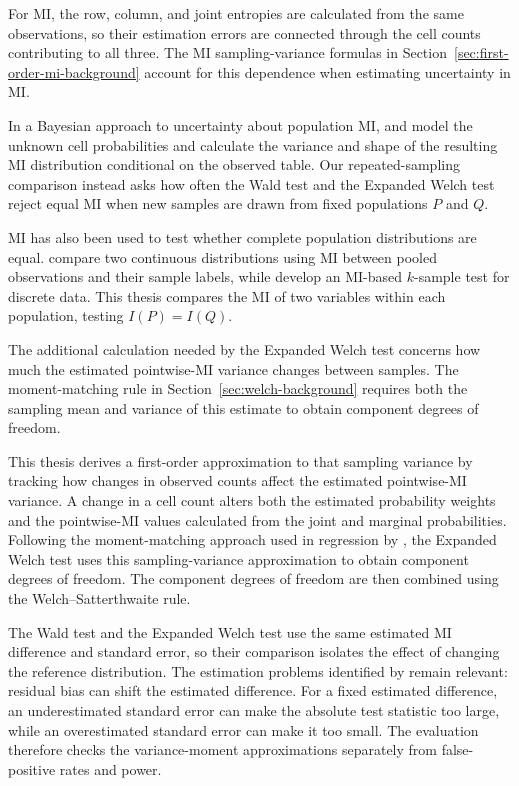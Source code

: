 For MI, the row, column, and joint entropies are calculated from the same
observations, so their estimation errors are connected through the cell
counts contributing to all three. The MI sampling-variance formulas in
Section~\ref{sec:first-order-mi-background} account for this dependence
when estimating uncertainty in MI.

In a Bayesian approach to uncertainty about population MI,
\citet{hutter2002} and \citet{hutterzaffalon2005} model the unknown cell
probabilities and calculate the variance and shape of the resulting MI
distribution conditional on the observed table. Our repeated-sampling
comparison instead asks how often the Wald test and the Expanded Welch
test reject equal MI when new samples are drawn from fixed populations
\(P\) and \(Q\).

MI has also been used to test whether complete population distributions
are equal. \citet{guha2014} compare two continuous distributions using MI
between pooled observations and their sample labels, while
\citet{drake2014} develop an MI-based \(k\)-sample test for discrete data.
This thesis compares the MI of two variables within each population,
testing \(I(P)=I(Q)\).

The additional calculation needed by the Expanded Welch test concerns how
much the estimated pointwise-MI variance changes between samples. The
moment-matching rule in Section~\ref{sec:welch-background} requires both
the sampling mean and variance of this estimate to obtain component
degrees of freedom.

This thesis derives a first-order approximation to that sampling variance
by tracking how changes in observed counts affect the estimated
pointwise-MI variance. A change in a cell count alters both the estimated
probability weights and the pointwise-MI values calculated from the joint
and marginal probabilities. Following the moment-matching approach used
in regression by \citet{panwall2002}, the Expanded Welch test uses this
sampling-variance approximation to obtain component degrees of freedom.
The component degrees of freedom are then combined using the
Welch--Satterthwaite rule.

The Wald test and the Expanded Welch test use the same estimated MI
difference and standard error, so their comparison isolates the effect of
changing the reference distribution.
The estimation problems identified by \citet{paninski2003} remain relevant:
residual bias can shift the estimated difference. For a fixed estimated
difference, an underestimated standard error can make the absolute test
statistic too large, while an overestimated standard error can make it
too small. The evaluation therefore
checks the variance-moment approximations separately from false-positive
rates and power.
